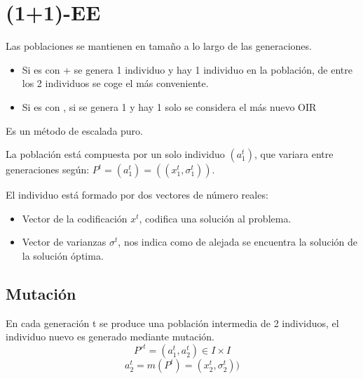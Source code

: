 \documentclass[12pt, twoside, openright]{report} %
\begin{document}
\section{(1+1)-EE}
Las poblaciones se mantienen en tamaño a lo largo de las generaciones.
\begin{itemize}
	\item Si es con + se genera 1 individuo y hay 1 individuo en la población, de entre los 2 individuos se coge el más conveniente.
	\item Si es con , si se genera 1 y hay 1 solo se considera el más nuevo OIR
\end{itemize}
Es un método de escalada puro.

La población está compuesta por un solo individuo $(a_1^t)$, que variara entre generaciones según: $P^t=(a^t_1)=((x^t_1, \sigma^t_1))$.

El individuo está formado por dos vectores de número reales: 
\begin{itemize}
	\item Vector de la codificación $x^t$, codifica una solución al problema.
	\item Vector de varianzas $\sigma^t$, nos indica como de alejada se encuentra la solución de la solución óptima.
\end{itemize}

\subsection{Mutación}
En cada generación t se produce una población intermedia de 2 individuos, el individuo nuevo es generado  mediante mutación.
$$P'^t=(a^t_1,a^t_2)\in I \times I$$
$$a^t_2=m(P^t)=(x^t_2, \sigma^t_2))$$
\end{document}
